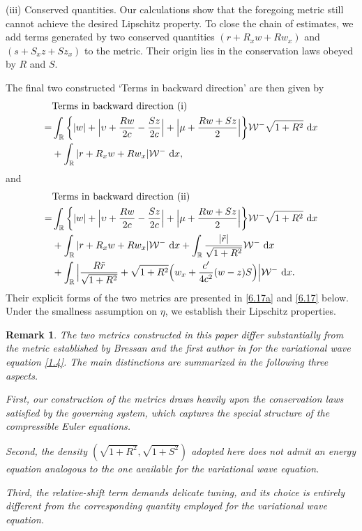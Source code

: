 \documentclass[11pt,reqno]{article}
\newtheorem{rem}{Remark}
\newcommand{\fr}{\frac}
\numberwithin{equation}{section}
\begin{document}
\noindent (iii) Conserved quantities. Our calculations show that the foregoing metric still cannot achieve the desired Lipschitz property. To close the chain of estimates, we add terms generated by two conserved quantities $(r+R_x w+Rw_x)$ and $(s+S_x z+Sz_x)$ to the metric. Their origin lies in the conservation laws obeyed by $R$ and $S$.

The final two constructed `Terms in backward direction' are then given by
\begin{align}\label{1.19}
\begin{split}
&{\rm Terms\ in\  backward\ direction\ (i)}  \\
=&\int_{\mathbb{R}}\bigg\{|w| +\Big|\upsilon +\fr{Rw}{2c}-\fr{Sz}{2c}\Big| +\Big|\mu +\fr{Rw+Sz}{2}\Big|\bigg\}\mathcal{W}^-\sqrt{1+R^2}\ {\rm d}x \\
&+\int_{\mathbb{R}}|r+R_xw+Rw_x|\mathcal{W}^-\ {\rm d}x,
\end{split}
\end{align}
and
\begin{align}\label{1.20}
\begin{split}
&{\rm Terms\ in\  backward\ direction\ (ii)}  \\
=&\int_{\mathbb{R}}\bigg\{|w| +\Big|\upsilon +\fr{Rw}{2c}-\fr{Sz}{2c}\Big| +\Big|\mu +\fr{Rw+Sz}{2}\Big|\bigg\}\mathcal{W}^-\sqrt{1+R^2}\ {\rm d}x \\
&+\int_{\mathbb{R}}|r+R_xw+Rw_x|\mathcal{W}^-\ {\rm d}x  +\int_{\mathbb{R}}\fr{|\tilde{r}|}{\sqrt{1+R^2}}\mathcal{W}^-\ {\rm d}x \\
&+\int_{\mathbb{R}}\Big|\fr{R\tilde{r}}{\sqrt{1+R^2}} +\sqrt{1+R^2}\Big(w_x+\fr{c'}{4c^2}(w-z)S\Big)\Big|\mathcal{W}^-\ {\rm d}x.
\end{split}
\end{align}
Their explicit forms of the two metrics are presented in \eqref{6.17a} and \eqref{6.17} below. Under the smallness assumption on $\eta$, we establish their Lipschitz properties.

\begin{rem}
The two metrics constructed in this paper differ substantially from the metric established by Bressan and the first author in \cite{BC2} for the variational wave equation \eqref{1.4}. The main distinctions are summarized in the following three aspects.

First, our construction of the metrics draws heavily upon the conservation laws satisfied by the governing system, which captures the special structure of the compressible Euler equations.

Second, the density $(\sqrt{1+R^2}, \sqrt{1+S^2})$ adopted here does not admit an energy equation analogous to the one available for the variational wave equation.

Third, the relative-shift term demands delicate tuning, and its choice is entirely different from the corresponding quantity employed for the variational wave equation.
\end{rem}
\end{document}
